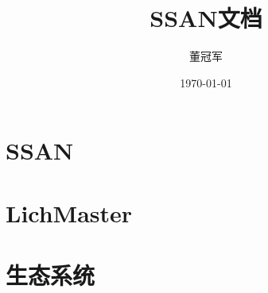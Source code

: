\documentclass[UTF8,oneside]{ctexbook}
\title{SSAN文档}
\author{董冠军}
\date{\today}
\begin{document}
\maketitle
\tableofcontents

\listoftodos[Notes]


%
%
%


%
%
%

\part{SSAN}







  

















% 
% 



% 
% 

\part{LichMaster}





\part{生态系统}
\end{document}
